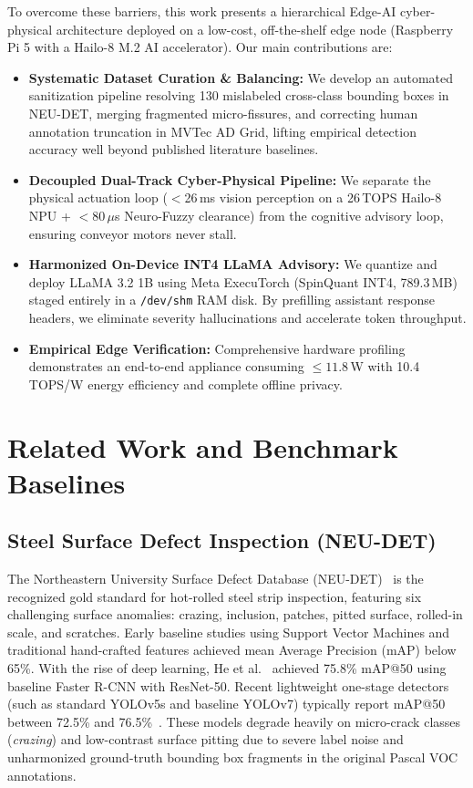 \documentclass[conference]{IEEEtran}
\begin{document}
To overcome these barriers, this work presents a hierarchical Edge-AI cyber-physical architecture deployed on a low-cost, off-the-shelf edge node (Raspberry Pi 5 with a Hailo-8 M.2 AI accelerator). Our main contributions are:
\begin{itemize}
    \item \textbf{Systematic Dataset Curation \& Balancing:} We develop an automated sanitization pipeline resolving 130 mislabeled cross-class bounding boxes in NEU-DET, merging fragmented micro-fissures, and correcting human annotation truncation in MVTec AD Grid, lifting empirical detection accuracy well beyond published literature baselines.
    \item \textbf{Decoupled Dual-Track Cyber-Physical Pipeline:} We separate the physical actuation loop ($<$26\,ms vision perception on a 26\,TOPS Hailo-8 NPU + $<80\,\mu$s Neuro-Fuzzy clearance) from the cognitive advisory loop, ensuring conveyor motors never stall.
    \item \textbf{Harmonized On-Device INT4 LLaMA Advisory:} We quantize and deploy LLaMA 3.2 1B using Meta ExecuTorch (SpinQuant INT4, 789.3\,MB) staged entirely in a \texttt{/dev/shm} RAM disk. By prefilling assistant response headers, we eliminate severity hallucinations and accelerate token throughput.
    \item \textbf{Empirical Edge Verification:} Comprehensive hardware profiling demonstrates an end-to-end appliance consuming $\le 11.8$\,W with 10.4\,TOPS/W energy efficiency and complete offline privacy.
\end{itemize}

\section{Related Work and Benchmark Baselines}

\subsection{Steel Surface Defect Inspection (NEU-DET)}
The Northeastern University Surface Defect Database (NEU-DET)~\cite{song2013neu} is the recognized gold standard for hot-rolled steel strip inspection, featuring six challenging surface anomalies: crazing, inclusion, patches, pitted surface, rolled-in scale, and scratches. Early baseline studies using Support Vector Machines and traditional hand-crafted features achieved mean Average Precision (mAP) below 65\%. With the rise of deep learning, He et al.~\cite{he2020steel} achieved 75.8\% mAP@50 using baseline Faster R-CNN with ResNet-50. Recent lightweight one-stage detectors (such as standard YOLOv5s and baseline YOLOv7) typically report mAP@50 between 72.5\% and 76.5\%~\cite{wang2023yolo_steel}. These models degrade heavily on micro-crack classes (\textit{crazing}) and low-contrast surface pitting due to severe label noise and unharmonized ground-truth bounding box fragments in the original Pascal VOC annotations.
\end{document}
